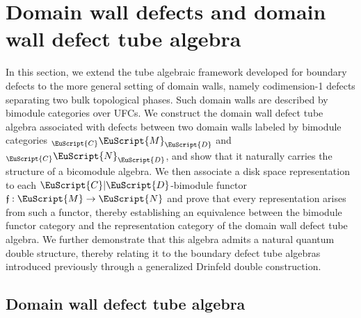 \documentclass[a4paper,11pt]{article}
\theoremstyle{definition}
\theoremstyle{remark}
\newcommand\eC           {\EuScript{C}}
\newcommand\eD           {\EuScript{D}}
\newcommand\eM          {\EuScript{M}}
\newcommand\eN         {\EuScript{N}}
\begin{document}

\section{Domain wall defects and domain wall defect tube algebra} 
\label{Sec:DomainwallTube}

In this section, we extend the tube algebraic framework developed for boundary defects to the more general setting of domain walls, namely codimension-1 defects separating two bulk topological phases. Such domain walls are described by bimodule categories over UFCs. We construct the domain wall defect tube algebra associated with defects between two domain walls labeled by bimodule categories ${_{\eC}}\eM_{\eD}$ and ${_{\eC}}\eN_{\eD}$, and show that it naturally carries the structure of a bicomodule algebra. We then associate a disk space representation to each $\eC|\eD$-bimodule functor $\mathfrak f:\eM\to\eN$ and prove that every representation arises from such a functor, thereby establishing an equivalence between the bimodule functor category and the representation category of the domain wall defect tube algebra. We further demonstrate that this algebra admits a natural quantum double structure, thereby relating it to the boundary defect tube algebras introduced previously through a generalized Drinfeld double construction.







\subsection{Domain wall defect tube algebra}

\end{document}

